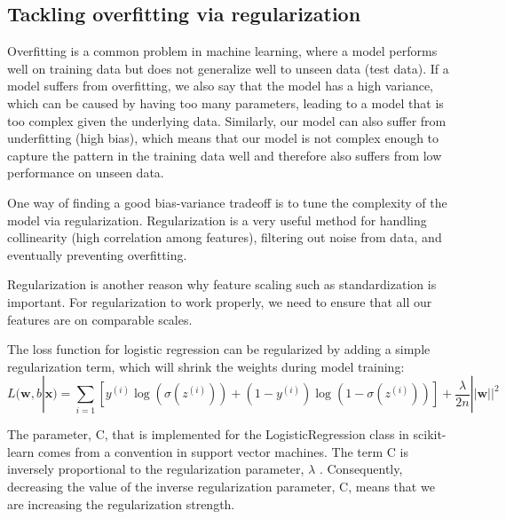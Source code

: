 \subsection{Tackling overfitting via regularization}
Overfitting is a common problem in machine learning, where a model performs well on training data but does not generalize well to unseen data (test data). If a model suffers from overfitting, we also say that the model has a high variance, which can be caused by having too many parameters, leading to a model that is too complex given the underlying data. Similarly, our model can also suffer from underfitting (high bias), which means that our model is not complex enough to capture the pattern in the training data well and therefore also suffers from low performance on unseen data.

One way of finding a good bias-variance tradeoff is to tune the complexity of the model via regularization. Regularization is a very useful method for handling collinearity (high correlation among features), filtering out noise from data, and eventually preventing overfitting.

\begin{tcolorbox}[title=Regularization and feature normalization]
    Regularization is another reason why feature scaling such as standardization is important. For regularization to work properly, we need to ensure that all our features are on comparable scales.
\end{tcolorbox}

The loss function for logistic regression can be regularized by adding a simple regularization term, which will shrink the weights during model training:
\begin{equation}
    L(\textbf{w}, b|\textbf{x})  =\sum_{i=1}\left[y^{(i)}\log(\sigma(z^{(i)}))+(1-y^{(i)})\log(1-\sigma(z^{(i)}))\right]+\frac{\lambda}{2n}||\textbf{w}||^2
\end{equation}

The parameter, \textsf{C}, that is implemented for the LogisticRegression class in scikit-learn comes from a convention in support vector machines. The term \textsf{C} is inversely proportional to the regularization parameter, $\lambda$ . Consequently, decreasing the value of the inverse regularization parameter, \textsf{C}, means that we are increasing the regularization strength.

